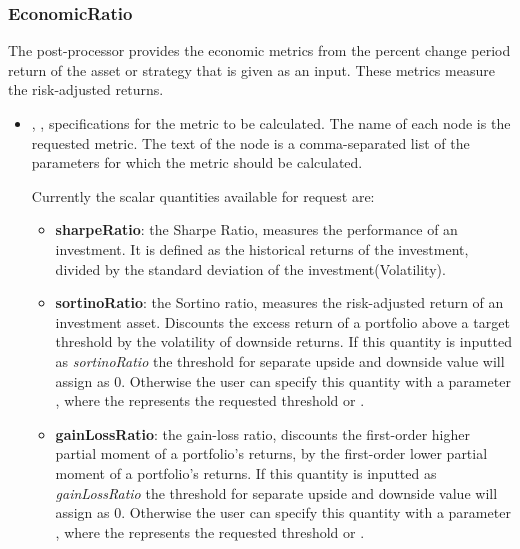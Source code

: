 \subsubsection{EconomicRatio}
\label{EconomicRatio}
The  post-processor provides the economic metrics from the percent change 
period return of the asset or strategy that is given as an input. These metrics measure the risk-adjusted returns. 
%

\begin{itemize}
  \item {}, ,
  specifications for the metric to be calculated. The name of each node is the requested metric. 
  The text of the node is a comma-separated list of the parameters for which the metric should be calculated. 

  Currently the scalar quantities available for request are:
  \begin{itemize}

  \item \textbf{sharpeRatio}: the Sharpe Ratio, measures the performance of an investment. It is defined as the  historical returns of the investment, divided by the standard deviation of the investment(Volatility). 
  \item \textbf{sortinoRatio}: the Sortino ratio, measures the risk-adjusted return of an investment asset. Discounts the excess return of a portfolio above a target threshold by the volatility of downside returns. If this quantity is inputted as \textit{sortinoRatio} the threshold for separate upside and downside value will assign as $0$. Otherwise the user can specify this quantity with a parameter , where the  represents the requested threshold  or .
  
  \item \textbf{gainLossRatio}: the gain-loss ratio, discounts the first-order higher partial moment of a portfolio's returns, by the first-order lower partial moment of a portfolio's returns. If this quantity is inputted as \textit{gainLossRatio} the threshold for separate upside and downside value will assign as $0$. Otherwise the user can specify this quantity with a parameter , where the  represents the requested threshold  or .
  

\end{itemize}
\end{itemize}
